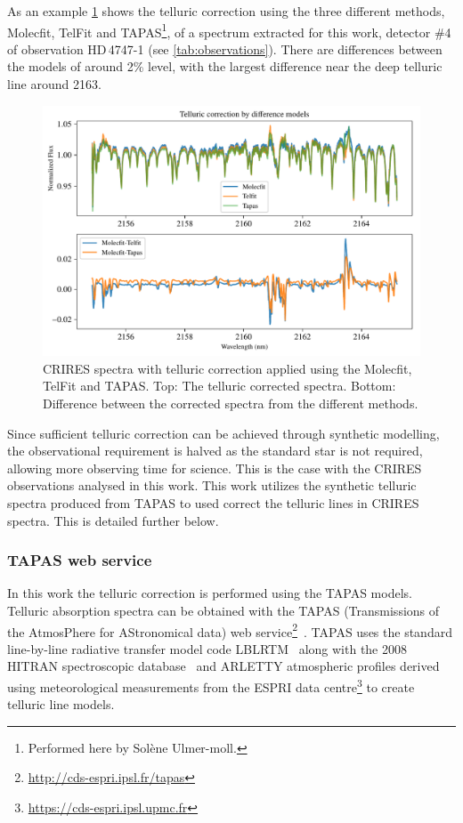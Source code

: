 As an example \cref{fig:telluricmodelcomparision} shows the telluric correction using the three different methods, {Molecfit}, {TelFit} and {TAPAS}\footnote{Performed here by Sol\`{e}ne Ulmer-moll.}, of a spectrum extracted for this work, detector \#4 of observation HD\,4747-1  (see \cref{tab:observations}).
There are differences between the models of around 2\% level, with the largest difference near the deep telluric line around 2163\nm{}.
\begin{figure}
    \centering
    \includegraphics[width=0.8\linewidth]{figures/atmos_and_models/Telluric_model_comparision}
    \caption[Telluric correction applied using the {Molecfit}, {TelFit} and {TAPAS}.]{CRIRES spectra with telluric correction applied using the {Molecfit}, {TelFit} and {TAPAS}.
        Top: The telluric corrected spectra.
        Bottom: Difference between the corrected spectra from the different methods.}
    \label{fig:telluricmodelcomparision}
\end{figure}

Since sufficient telluric correction can be achieved through synthetic modelling, the observational requirement is halved as the standard star is not required, allowing more observing time for science.
This is the case with the {CRIRES} observations analysed in this work.
This work utilizes the synthetic telluric spectra produced from {TAPAS} to used correct the telluric lines in {CRIRES} spectra.
This is detailed further below.

\subsubsection{{TAPAS} web service}
\label{subsubsec:TAPAS}
In this work the telluric correction is performed using the TAPAS models.
Telluric absorption spectra can be obtained with the {TAPAS} (Transmissions of the AtmosPhere for AStronomical data) web service\footnote{\href{http://cds-espri.ipsl.fr/tapas}{http://cds-espri.ipsl.fr/tapas}}~\citep{bertaux_tapas_2014}.
{TAPAS} uses the standard line-by-line radiative transfer model code LBLRTM~\citep{clough_linebyline_1995} along with the 2008 {HITRAN} spectroscopic database~\citep{rothman_hitran_2009} and {ARLETTY} atmospheric profiles derived using meteorological measurements from the ESPRI data centre\footnote{\href{https://cds-espri.ipsl.upmc.fr}{https://cds-espri.ipsl.upmc.fr}} to create telluric line models.

